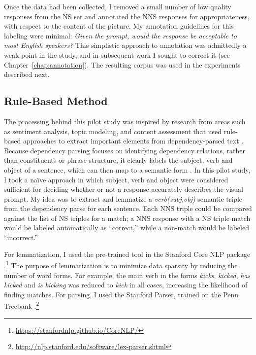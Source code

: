 Once the data had been collected, I removed a small number of low quality responses from the NS set and annotated the NNS responses for appropriateness, with respect to the content of the picture. My annotation guidelines for this labeling were minimal: \textit{Given the prompt, would the response be acceptable to most English speakers?} This simplistic approach to annotation was admittedly a weak point in the study, and in subsequent work I sought to correct it (see Chapter~\ref{chap:annotation}). The resulting corpus was used in the experiments described next.


\subsection{Rule-Based Method}
\label{sec:rule-method}

The processing behind this pilot study was inspired by research from areas such as sentiment analysis, topic modeling, and content assessment that used rule-based approaches to extract important elements from dependency-parsed text \citep{nastase2006,bailey:meurers:08,dicaro2013}. Because dependency parsing focuses on identifying dependency relations, rather than constituents or phrase structure, it clearly labels the subject, verb and object of a sentence, which can then map to a semantic form \citep{Kuebler.McDonald.Nivre-09}. In this pilot study, I took a na\"ive approach in which subject, verb and object were considered sufficient for deciding whether or not a response accurately describes the visual prompt. My idea was to extract and lemmatize a \textit{verb(subj,obj)} semantic triple from the dependency parse for each sentence. Each NNS triple could be compared against the list of NS triples for a match; a NNS response with a NS triple match would be labeled automatically as ``correct,'' while a non-match would be labeled ``incorrect.''

For lemmatization, I used the pre-trained tool in the Stanford Core NLP package \citep{stanford-corenlp-2014}.\footnote{\url{https://stanfordnlp.github.io/CoreNLP/}} The purpose of lemmatization is to minimize data sparsity by reducing the number of word forms. For example, the main verb in the forms \textit{kicks}, \textit{kicked}, \textit{has kicked} and \textit{is kicking} was reduced to \textit{kick} in all cases, increasing the likelihood of finding matches. For parsing, I used the Stanford Parser, trained on the Penn Treebank \citep{demarneffe:ea:06, klein:manning:03}.\footnote{\url{http://nlp.stanford.edu/software/lex-parser.shtml}}


